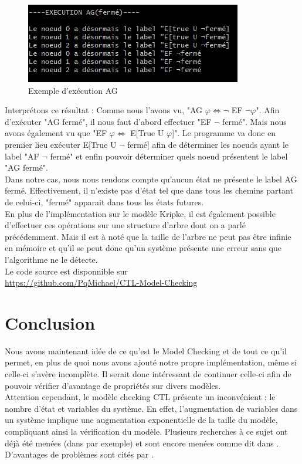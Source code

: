 \documentclass[runningheads,a4paper]{llncs}
\begin{document}
\begin{figure}[!h]
	\includegraphics[scale=0.8]{executionExemple.png}
	\centering
	\caption{Exemple d'exécution AG}
	\label{label-image9}
\end{figure}

\noindent Interprétons ce résultat : Comme nous l'avons vu, "AG $\varphi \Leftrightarrow \lnot$ EF $\lnot \varphi$". Afin d'exécuter "AG fermé", il nous faut d'abord effectuer "EF $\lnot$ fermé". Mais nous avons également vu que "EF $\varphi \Leftrightarrow$ E[True U $\varphi$]". Le programme va donc en premier lieu exécuter E[True U $\lnot$ fermé] afin de déterminer les noeuds ayant le label "AF $\lnot$ fermé" et enfin pouvoir déterminer quels noeud présentent le label "AG fermé".\\
\noindent Dans notre cas, nous nous rendons compte qu'aucun état ne présente le label AG fermé. Effectivement, il n'existe pas d'état tel que dans tous les chemins partant de celui-ci, "fermé" apparait dans tous les états futures.\\

\noindent En plus de l'implémentation sur le modèle Kripke, il est également possible d'effectuer ces opérations sur une structure d'arbre dont on a parlé précédemment. Mais il est à noté que la taille de l'arbre ne peut pas être infinie en mémoire et qu'il se peut donc qu'un système présente une erreur sans que l'algorithme ne le détecte. \\

\noindent Le code source est disponnible sur \\ \url{https://github.com/PqMichael/CTL-Model-Checking}

\section{Conclusion}

Nous avons maintenant idée de ce qu'est le Model Checking et de tout ce qu'il permet, en plus de quoi nous avons ajouté notre propre implémentation, même si celle-ci s'avère incomplète. Il serait donc intéressant de continuer celle-ci afin de pouvoir vérifier d'avantage de propriétés sur divers modèles. \\

\noindent Attention cependant, le modèle checking CTL présente un inconvénient : le nombre d'état et variables du système. En effet, l'augmentation de variables dans un système implique une augmentation exponentielle de la taille du modèle, compliquant ainsi la vérification du modèle.
Plusieurs recherches à ce sujet ont déjà été menées (dans \cite{a2} par exemple) et sont encore menées comme dit dans \cite{a1}.\\
D'avantages de problèmes sont cités par \citep{a3}.

{}

\end{document}
